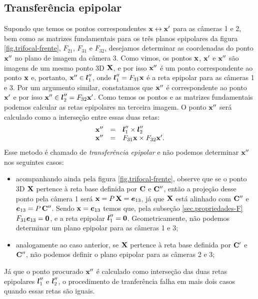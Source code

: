 \subsection{Transferência epipolar}\label{sec.trans-epipolar}
Supondo que temos os pontos correspondentes $\mathbf{x}\leftrightarrow\mathbf{x}'$ para as câmeras 1 e 2, bem como as matrizes fundamentais para os três planos epipolares da figura \ref{fig.trifocal-frente}, $F_{21}$, $F_{31}$ e $F_{32}$, desejamos determinar as coordenadas do ponto $\mathbf{x}''$ no plano de imagem da câmera 3. Como vimos, os pontos $\mathbf{x}$, $\mathbf{x}'$ e $\mathbf{x}''$ são imagens de um mesmo ponto 3D $\mathbf{X}$, e por isso $\mathbf{x}''$ é um ponto correspondente ao ponto $\mathbf{x}$ e, portanto, $\mathbf{x}''\in\boldsymbol{l}''_1$, onde $\boldsymbol{l}''_1=F_{31}\mathbf{x}$ é a reta epipolar para as câmeras 1 e 3. Por um argumento similar, constatamos que $\mathbf{x}''$ é correspondente ao ponto $\mathbf{x}'$ e por isso $\mathbf{x}''\in\boldsymbol{l}''_2=F_{32}\mathbf{x}'$. Como temos os pontos e as matrizes fundamentais podemos calcular as retas epipolares na terceira imagem. O ponto $\mathbf{x}''$ será calculado como a interseção entre essas duas retas:
\begin{equation}
\begin{array}{rcl}
\mathbf{x}''&=&\boldsymbol{l}''_1\times\boldsymbol{l}''_2\\
\mathbf{x}''&=&F_{31}\mathbf{x}\times F_{32}\mathbf{x}'.
\end{array}
\end{equation}
Esse metodo é chamado de {\it transferência epipolar} e não podemos determinar $\mathbf{x}''$ nos seguintes casos:
\begin{itemize}
\item acompanhando ainda pela figura \ref{fig.trifocal-frente}, observe que se o ponto 3D $\mathbf{X}$ pertence à reta base definida por ${\bf C}$ e ${\bf C}''$, então a projeção desse ponto pela câmera 1 será $\mathbf{x}=P\,\mathbf{X}=\boldsymbol{e}_{13}$, já que $\mathbf{X}$ está alinhado com ${\bf C}''$ e $\boldsymbol{e}_{13}=P\,{\bf C}''$. Sendo $\mathbf{x}=\boldsymbol{e}_{13}$ temos que, pela subseção \ref{sec.propriedades-F} $F_{31}\boldsymbol{e}_{13}={\bf 0}$, e a reta epipolar $\boldsymbol{l}''_1={\bf 0}$. Geometricamente, não podemos determinar um plano epipolar para as câmeras 1 e 3;
\item analogamente ao caso anterior, se $\mathbf{X}$ pertence à reta base definida por ${\bf C}'$ e ${\bf C}''$, não podemos definir o plano epipolar para as câmeras 2 e 3;\\
\end{itemize}

Já que o ponto procurado $\mathbf{x}''$ é calculado como interseção das duas retas epipolares $\boldsymbol{l}''_1$ e $\boldsymbol{l}''_2$, o procedimento de tranferência falha em mais dois casos quando essas retas são iguais.

